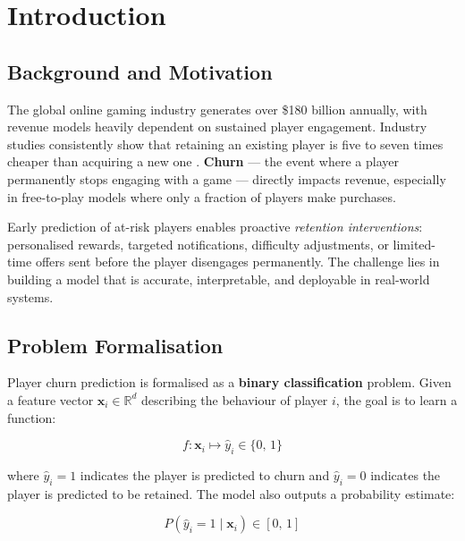 \documentclass[12pt, a4paper]{article}
\begin{document}
\tableofcontents
\newpage

\section{Introduction}

\subsection{Background and Motivation}

The global online gaming industry generates over \$180 billion annually,
with revenue models heavily dependent on sustained player engagement.
Industry studies consistently show that retaining an existing player is
five to seven times cheaper than acquiring a new one \cite{runge2014}.
\textbf{Churn} — the event where a player permanently stops engaging with
a game — directly impacts revenue, especially in free-to-play models
where only a fraction of players make purchases.

Early prediction of at-risk players enables proactive \textit{retention
interventions}: personalised rewards, targeted notifications, difficulty
adjustments, or limited-time offers sent before the player disengages
permanently. The challenge lies in building a model that is accurate,
interpretable, and deployable in real-world systems.

\subsection{Problem Formalisation}

Player churn prediction is formalised as a \textbf{binary classification}
problem. Given a feature vector $\mathbf{x}_i \in \mathbb{R}^d$ describing
the behaviour of player $i$, the goal is to learn a function:

\begin{equation}
    f : \mathbf{x}_i \longmapsto \hat{y}_i \in \{0,\, 1\}
\end{equation}

where $\hat{y}_i = 1$ indicates the player is predicted to churn and
$\hat{y}_i = 0$ indicates the player is predicted to be retained.
The model also outputs a probability estimate:

\begin{equation}
    P(\hat{y}_i = 1 \mid \mathbf{x}_i) \in [0,\, 1]
\end{equation}
\end{document}
